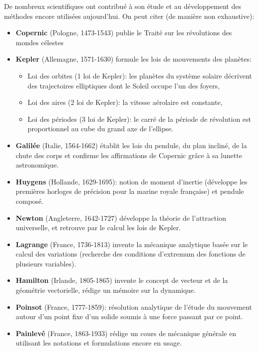 \documentclass[11pt]{article}
\begin{document}
De nombreux scientifiques ont contribué à son étude et au développement des méthodes encore utilisées aujourd'hui. On peut citer (de manière non exhaustive):
\begin{itemize}
\item \textbf{Copernic} (Pologne, 1473-1543) publie le \og{}Traité sur les révolutions des mondes célestes\fg{}
\item \textbf{Kepler} (Allemagne, 1571-1630) formule les lois de mouvements des planètes:
\begin{itemize}
\item Loi des orbites (1\iere \; loi de Kepler): les planètes du système solaire décrivent des trajectoires elliptiques dont le Soleil occupe l'un des foyers,
\item Loi des aires (2\ieme \; loi de Kepler): la vitesse aérolaire est constante,
\item Loi des périodes (3\ieme \; loi de Kepler): le carré de la période de révolution est proportionnel au cube du grand axe de l'ellipse.
\end{itemize}
\item \textbf{Galilée} (Italie, 1564-1662) établit les lois du pendule, du plan incliné, de la chute des corps et confirme les affirmations de Copernic grâce à sa lunette astronomique.
\item \textbf{Huygens} (Hollande, 1629-1695): notion de moment d'inertie (développe les premières horloges de précision pour la marine royale française) et pendule composé.
\item \textbf{Newton} (Angleterre, 1642-1727) développe la théorie de l'attraction universelle, et retrouve par le calcul les lois de Kepler.
\item \textbf{Lagrange} (France, 1736-1813) invente la mécanique analytique basée sur le calcul des variations (recherche des conditions d'extremum des fonctions de plusieurs variables).
\item \textbf{Hamilton} (Irlande, 1805-1865) invente le concept de vecteur et de la géométrie vectorielle, rédige un mémoire sur la dynamique.
\item \textbf{Poinsot} (France, 1777-1859): résolution analytique de l'étude du mouvement autour d'un point fixe d'un solide soumis à une force passant par ce point.
\item \textbf{Painlevé} (France, 1863-1933) rédige un cours de mécanique générale en utilisant les notations et formulations encore en usage.
\end{itemize}
\end{document}
